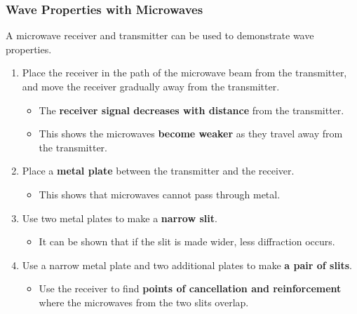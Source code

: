 \subsubsection*{Wave Properties with Microwaves}

A microwave receiver and transmitter can be used to demonstrate wave properties.

\begin{enumerate}
    \item Place the receiver in the path of the microwave beam from the transmitter, and move the receiver gradually away from the transmitter.
        \begin{itemize}
            \item The \textbf{receiver signal decreases with distance} from the transmitter.
            \item This shows the microwaves \textbf{become weaker} as they travel away from the transmitter.
        \end{itemize}

    \item Place a \textbf{metal plate} between the transmitter and the receiver.
        \begin{itemize}
            \item This shows that microwaves cannot pass through metal.
        \end{itemize}

    \item Use two metal plates to make a \textbf{narrow slit}.
        \begin{itemize}
            \item It can be shown that if the slit is made wider, less diffraction occurs.
        \end{itemize}

    \item Use a narrow metal plate and two additional plates to make \textbf{a pair of slits}.
        \begin{itemize}
            \item Use the receiver to find \textbf{points of cancellation and reinforcement} where the microwaves from the two slits overlap.
        \end{itemize}
\end{enumerate}
